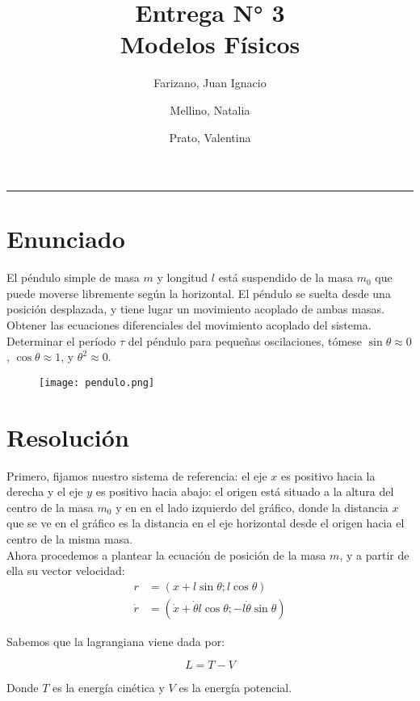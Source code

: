 \documentclass[11pt]{article}
\title{
  Entrega N° 3 \\
  \large Modelos Físicos
}
\author{
  Farizano, Juan Ignacio \\
  \and
  Mellino, Natalia \\
  \and
  Prato, Valentina
}
\date{}
\begin{document}
\maketitle
\noindent\rule{\textwidth}{1pt}

\section*{Enunciado}
El péndulo simple de masa $m$ y longitud $l$ está suspendido de la masa $m_0$
que puede moverse libremente según la horizontal. El péndulo se suelta desde una
posición desplazada, y tiene lugar un movimiento acoplado de ambas masas.
Obtener las ecuaciones diferenciales del movimiento acoplado del sistema.
Determinar el período $\tau$ del péndulo para pequeñas oscilaciones, tómese
 $\sin \theta \approx 0$, $\cos \theta \approx 1$, y $\theta^2 \approx 0$.

 \begin{figure}[h!]
  \begin{center}
    \texttt{[image: pendulo.png]}
  \end{center}
\end{figure}

\section*{Resolución}

Primero, fijamos nuestro sistema de referencia: el eje $x$ es positivo hacia
la derecha y el eje $y$ es positivo hacia abajo: el origen está situado a
la altura del centro de la masa $m_0$ y en en el lado izquierdo del gráfico,
donde la distancia $x$ que se ve en el gráfico es la distancia en el eje horizontal
desde el origen hacia el centro de la misma masa. \\

Ahora procedemos a plantear la ecuación de posición de la masa $m$, y a partir
de ella su vector velocidad:
\begin{align*}
  r &= (x + l \sin \theta; l \cos \theta) \\
  \dot{r} &= (\dot{x} + \dot{\theta} l \cos \theta; -l \dot{\theta} \sin \theta)
\end{align*}

Sabemos que la lagrangiana viene dada por:

\begin{equation*}
  L = T - V
\end{equation*}

Donde $T$ es la energía cinética y $V$ es la energía potencial.
\end{document}
